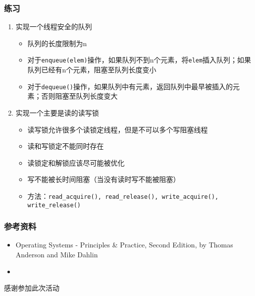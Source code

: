 \begin{CJK}{UTF8}{gbsn}
\begin{frame} [fragile]
	\frametitle{练习}
	\begin{enumerate}
	\item 实现一个线程安全的队列
		\begin{itemize}
		\item 队列的长度限制为n
		\item 对于\texttt{enqueue(elem)}操作，如果队列不到n个元素，将\texttt
				{elem}插入队列；如果队列已经有n个元素，阻塞至队列长度变小
		\item 对于\texttt{dequeue()}操作，如果队列中有元素，返回队列中最早被插入的元素；否则阻塞至队列长度变大
		\end{itemize}
	\item 实现一个主要是读的读写锁
		\begin{itemize}
		\item 读写锁允许很多个读锁定线程，但是不可以多个写阻塞线程
		\item 读和写锁定不能同时存在
		\item 读锁定和解锁应该尽可能被优化
		\item 写不能被长时间阻塞（当没有读时写不能被阻塞）
		\item 方法：\texttt{read\_acquire(), read\_release(), write\_acquire(), write\_release()}
		\end{itemize}
\begin{comment}
# from `locate blocked.py`
class ReadWriteLock :
	def __init__(self) :
		self.writing = False	# whether a writer is waiting / writing
		self.reading = 0		# 0: no readers; > 0: number of readers
		self.lock = threading.Lock()
		self.read_cv = threading.Condition(self.lock)
		self.write_cv = threading.Condition(self.lock)
	def read_acquire(self) :
		with self.lock :
			while self.writing :
				self.read_cv.wait()
			self.reading += 1
	def read_release(self) :
		with self.lock :
			self.reading -= 1
			if self.writing and not self.reading :
				self.write_cv.notify()
	def write_acquire(self) :
		with self.lock :
			while self.writing or self.reading :
				self.write_cv.wait()
			self.writing = True
	def write_release(self) :
		with self.lock :
			self.writing = False
			self.read_cv.notify_all()
\end{comment}
	\end{enumerate}
\end{frame}

\begin{frame}
	\frametitle{参考资料}
	\begin{itemize}
	\item Operating Systems - Principles \& Practice, Second Edition,
		by Thomas Anderson and Mike Dahlin
	\item {}
	\end{itemize}
\end{frame}

\PreLastFrame
\begin{frame}
	\centerline{\fontsize{32}{32}\selectfont 感谢参加此次活动}
\end{frame}

\newpage
\end{CJK}



